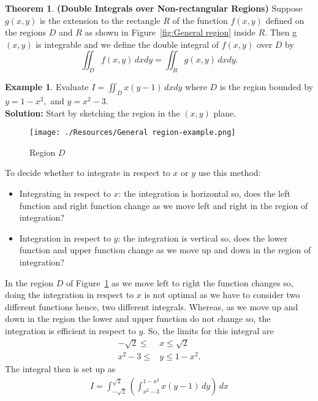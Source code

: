 \documentclass[12pt, a4paper]{article}
\theoremstyle{definition}
\newtheorem{theorem}{Theorem}[section]
\newtheorem*{example}{Example}
\theoremstyle{plain}
\begin{document}
\begin{theorem}
\textbf{(Double Integrals over Non-rectangular Regions)} Suppose $g(x, y)$ is the extension to the rectangle $R$ of the function $f (x, y)$ defined on the regions $D$ and $R$ as shown in Figure~\ref{fig:General region} inside $R.$ Then g$(x, y)$ is integrable and we define the double integral of $f (x, y)$ over $D$ by $$\iint_D f(x,y) \, dxdy =\iint_R g(x,y) \, dxdy.$$
\end{theorem}

\begin{example}
Evaluate $I=\iint_D x(y-1) \, dxdy$ where $D$ is the region bounded by $y=1-x^2,$ and $y=x^2-3.$ \\
\textbf{Solution:} Start by sketching the region in the $(x,y)$ plane.
\begin{figure}[H]
\centering
\texttt{[image: ./Resources/General region-example.png]}
\caption{Region $D$}
\label{fig:General region-example}
\end{figure}

To decide whether to integrate in respect to $x$ or $y$ use this method: \begin{itemize}

	\item Integrating in respect to $x$: the integration is horizontal so, does the left function and right function change as we move left and right in the region of integration?

	\item Integration in respect to $y$: the integration is vertical so, does the lower function and upper function change as we move up and down in the region of integration?
\end{itemize} 

In the region $D$ of Figure~\ref{fig:General region-example} as we move left to right the function changes so, doing the integration in respect to $x$ is not optimal as we have to consider two different functions hence, two different integrals. Whereas, as we move up and down in the region the lower and upper function do not change so, the integration is efficient in respect to $y.$ So, the limits for this integral are $$\begin{aligned}
-\sqrt{2}\leq &x \leq \sqrt{2}\\
x^2-3\leq &y \leq 1-x^2.
\end{aligned}$$ The integral then is set up as $$\begin{aligned}
I=\int_{-\sqrt{2}}^{\sqrt{2}}\left(\int_{x^2-3}^{1-x^2}x(y-1)\, dy\right)\, dx
\end{aligned}$$
\end{example}
\end{document}
